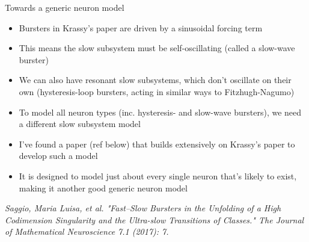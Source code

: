 \documentclass{beamer}
\begin{document}
\begin{frame}[label={sec:org95ab621}]{Towards a generic neuron model}
\begin{itemize}
\item Bursters in Krassy's paper are driven by a sinusoidal forcing term
\item This means the slow subsystem must be self-oscillating (called a slow-wave burster)
\item We can also have resonant slow subsystems, which don't oscillate on their own (hysteresis-loop bursters, acting in similar ways to Fitzhugh-Nagumo)
\item To model all neuron types (inc. hysteresis- and slow-wave bursters), we need a different slow subsystem model
\item I've found a paper (ref below) that builds extensively on Krassy's paper to develop such a model
\item It is designed to model just about every single neuron that's likely to exist, making it another good generic neuron model
\end{itemize}

\emph{Saggio, Maria Luisa, et al. "Fast–Slow Bursters in the Unfolding of a High Codimension Singularity and the Ultra-slow Transitions of Classes." The Journal of Mathematical Neuroscience 7.1 (2017): 7.}
\end{frame}
\end{document}
